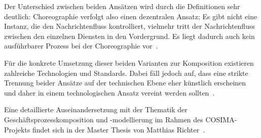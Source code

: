   Der Unterschied zwischen beiden Ansätzen wird durch die Definitionen sehr deutlich: Choreographie verfolgt also einen dezentralen Ansatz; Es gibt nicht eine Instanz, die den Nachrichtenfluss kontrolliert, vielmehr tritt der Nachrichtenfluss zwischen den einzelnen Diensten in den Vordergrund. Es liegt dadurch auch kein ausführbarer Prozess bei der Choreographie vor~\citep[S. 46]{peltz2003wso}.
  
  Für die konkrete Umsetzung dieser beiden Varianten zur Komposition existieren zahlreiche Technologien und Standards. Dabei fäll jedoch auf, dass eine strikte Trennung beider Ansätze auf der technischen Ebene eher künstlich erscheinen und daher in einem technologischen Ansatz vereint werden sollten~\citep[S. 42]{papazoglou2007soc}.
  
  Eine detaillierte Auseinandersetzung mit der Thematik der Geschäftsprozesskomposition und -modellierung im Rahmen des COSIMA-Projekts findet sich in der Master Thesis von Matthias Richter~\citep{samma08}.



% 


  
